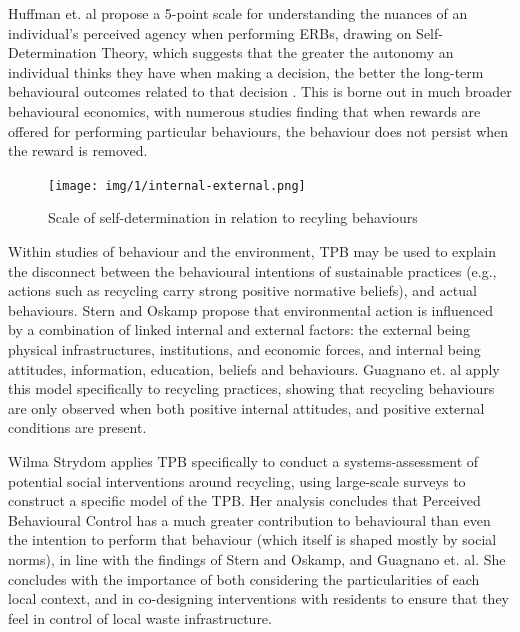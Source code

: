 \documentclass[nofonts,nols,justified,nobib]{tufte-book}
\begin{document}
Huffman et. al propose a 5-point scale for understanding the nuances of an individual's perceived agency when performing ERBs, drawing on Self-Determination Theory, which suggests that the greater the autonomy an individual thinks they have when making a decision, the better the long-term behavioural outcomes related to that decision \cite{huffman_when_2014}. This is borne out in much broader behavioural economics, with numerous studies finding that when rewards are offered for performing particular behaviours, the behaviour does not persist when the reward is removed.

\begin{figure}
\texttt{[image: img/1/internal-external.png]}
\caption{Scale of self-determination in relation to recyling behaviours \cite{huffman_when_2014}}
\end{figure}

Within studies of behaviour and the environment, TPB may be used to explain the disconnect between the behavioural intentions of sustainable practices (e.g., actions such as recycling carry strong positive normative beliefs), and actual behaviours. Stern and Oskamp propose that environmental action is influenced by a combination of linked internal and external factors: the external being physical infrastructures, institutions, and economic forces, and internal being attitudes, information, education, beliefs and behaviours\cite{stern_managing_1987}. Guagnano et. al apply this model specifically to recycling practices, showing that recycling behaviours are only observed when both positive internal attitudes, and positive external conditions are present\cite{guagnano_influences_1995}.

Wilma Strydom applies TPB specifically to conduct a systems-assessment of potential social interventions around recycling, using large-scale surveys to construct a specific model of the TPB. Her analysis concludes that Perceived Behavioural Control has a much greater contribution to behavioural than even the intention to perform that behaviour (which itself is shaped mostly by social norms), in line with the findings of Stern and Oskamp, and Guagnano et. al. She concludes with the importance of both considering the particularities of each local context, and in co-designing interventions with residents to ensure that they feel in control of local waste infrastructure. \cite{strydom_applying_2018}
\end{document}
